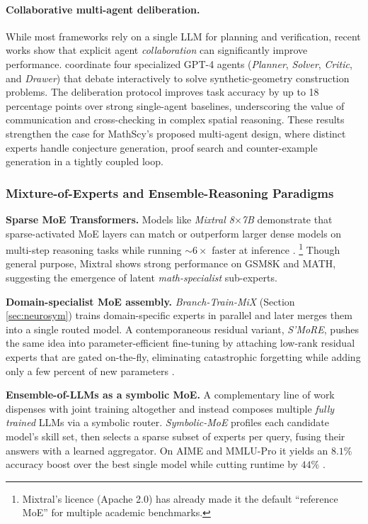 \documentclass[acmsmall,anonymous]{acmart}
\begin{document}
\paragraph{Collaborative multi-agent deliberation.}
While most frameworks rely on a single LLM for planning and verification, recent works show that explicit agent
\emph{collaboration} can significantly improve performance.
\citet{du2024collabgeo} coordinate four specialized GPT-4 agents
(\emph{Planner}, \emph{Solver}, \emph{Critic}, and \emph{Drawer}) that debate
interactively to solve synthetic-geometry construction problems.
The deliberation protocol improves task accuracy by up to
18\,percentage points over strong single-agent baselines, underscoring the
value of communication and cross-checking in complex spatial reasoning.
These results strengthen the case for MathScy’s proposed multi-agent design,
where distinct experts handle conjecture generation, proof search and
counter-example generation in a tightly coupled loop.

\subsubsection{Mixture-of-Experts and Ensemble-Reasoning Paradigms}
\label{sec:moe}

\textbf{Sparse MoE Transformers.}  
Models like \emph{Mixtral 8$\times$7B}
demonstrate that sparse-activated MoE layers can match or outperform larger dense models on multi-step reasoning tasks while running
$\sim\!6\times$ faster at inference
\citep{jiang2024mixtral}.%
\footnote{Mixtral’s licence (Apache 2.0) has already made it the default
“reference MoE” for multiple academic benchmarks.}
Though general purpose, Mixtral shows strong performance on GSM8K and MATH, suggesting the emergence of latent \emph{math-specialist} sub-experts.

\textbf{Domain-specialist MoE assembly.}  
\emph{Branch-Train-MiX} (Section \ref{sec:neurosym}) trains domain-specific
experts in parallel and later merges them into a single routed model.
A contemporaneous residual variant, \emph{S’MoRE}, pushes the same idea
into parameter-efficient fine-tuning by attaching low-rank residual experts
that are gated on-the-fly, eliminating catastrophic forgetting while
adding only a few percent of new parameters
\citep{zeng2025smore}.

\textbf{Ensemble-of-LLMs as a symbolic MoE.}  
A complementary line of work dispenses with joint training altogether
and instead composes multiple \emph{fully trained} LLMs via a symbolic
router.  \emph{Symbolic-MoE} profiles each candidate model’s skill set,
then selects a sparse subset of experts per query, fusing their answers
with a learned aggregator.  On AIME and MMLU-Pro it yields an
$8.1\%$ accuracy boost over the best single model while cutting runtime
by $44\%$ \citep{chen2025symbolicmoe}.
\end{document}
